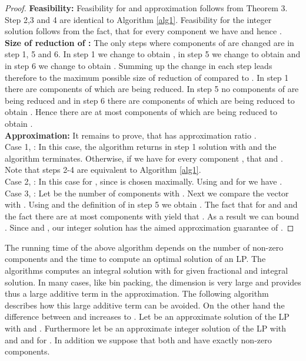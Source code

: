 \documentclass[a4paper,11pt]{article}
\begin{document}
\begin{proof}
	{\bf Feasibility:} Feasibility for  and approximation  
	follows from Theorem 3. Step 2,3 and 4 are identical to Algorithm \ref{alg1}.
	Feasibility for the integer solution  follows from the fact, that for every component  we have 
	 and hence .\\
  {\bf Size of reduction of :} The only steps where components of  are changed are in step 1, 5 and 6. 
  In step 1 we change 
	 to obtain , in step 5 we change  to obtain  and in step 6
	we change  to obtain . Summing up the change in each step leads therefore to
	the maximum possible size of reduction of  compared to .
	In step 1 there are  components of  which are being reduced. In step 5
	no components of  are being reduced and in step 6 there are  
	components of  which are being reduced to obtain . Hence there are at most 
	components of  which are being reduced to obtain .\\
  {\bf Approximation:} It remains to prove, that  has approximation ratio .\\
  Case 1, :
  In this case, the algorithm returns in step 1 solution  with 
  and the algorithm terminates.
  Otherwise, if  we have for every component , that  and . Note that steps 2-4 are equivalent to Algorithm \ref{alg1}.\\
  Case 2, :
  In this case  for , since 
  is chosen maximally. Using  and  for
   we have .\\
  Case 3, :
  Let  be the number of components with . Next we compare the vector  with .
  Using  and the definition of  in step 5 we obtain 
  .
  The fact that  for  and  and the fact there are at most  components with  yield that
  . As a result we can bound 
  . 
  Since  and ,
  our integer solution  has the aimed approximation guarantee of .
\end{proof}
The running time of the above algorithm depends on the number of non-zero components and the time to compute 
an optimal solution of an LP. The algorithms computes an integral solution  with 
 for given fractional and integral solution.
In many cases, like bin packing, the dimension  is very large and provides thus a large additive
term in the approximation. The following algorithm describes how this large additive term can be avoided.
On the other hand the difference between  and  increases to .
Let  be an approximate solution of the LP  with
 and . 
Furthermore let  be an approximate integer solution of the LP with 
and 
and  for .
In addition we suppose that both  and  have exactly 
non-zero components. 
\end{document}
